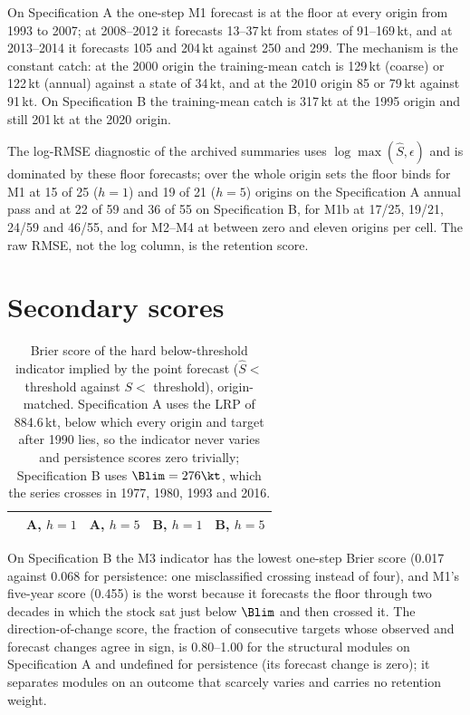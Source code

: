On Specification A the one-step M1 forecast is at the floor at every origin from 1993 to 2007; at 2008--2012 it forecasts 13--37\,kt from states of 91--169\,kt, and at 2013--2014 it forecasts 105 and 204\,kt against 250 and 299. The mechanism is the constant catch: at the 2000 origin the training-mean catch is 129\,kt (coarse) or 122\,kt (annual) against a state of 34\,kt, and at the 2010 origin 85 or 79\,kt against 91\,kt. On Specification B the training-mean catch is 317\,kt at the 1995 origin and still 201\,kt at the 2020 origin.

The log-RMSE diagnostic of the archived summaries uses $\log\max(\hat S,\epsilon)$ and is dominated by these floor forecasts; over the whole origin sets the floor binds for M1 at 15 of 25 ($h=1$) and 19 of 21 ($h=5$) origins on the Specification A annual pass and at 22 of 59 and 36 of 55 on Specification B, for M1b at 17/25, 19/21, 24/59 and 46/55, and for M2--M4 at between zero and eleven origins per cell. The raw RMSE, not the log column, is the retention score.

\FloatBarrier
\section{Secondary scores}\label{si:secondary}

\begin{table}[!htb]
\centering\small
\caption{Brier score of the hard below-threshold indicator implied by the point forecast ($\hat S < $ threshold against $S <$ threshold), origin-matched. Specification A uses the LRP of 884.6\,kt, below which every origin and target after 1990 lies, so the indicator never varies and persistence scores zero trivially; Specification B uses $\Blim = 276\kt$, which the series crosses in 1977, 1980, 1993 and 2016.}
\label{tab:si_brier}
\begin{tabular}{@{}lrrrr@{}}
\toprule
 & A, $h=1$ & A, $h=5$ & B, $h=1$ & B, $h=5$ \\
\midrule

\bottomrule
\end{tabular}
\end{table}

On Specification B the M3 indicator has the lowest one-step Brier score (0.017 against 0.068 for persistence: one misclassified crossing instead of four), and M1's five-year score (0.455) is the worst because it forecasts the floor through two decades in which the stock sat just below $\Blim$ and then crossed it. The direction-of-change score, the fraction of consecutive targets whose observed and forecast changes agree in sign, is 0.80--1.00 for the structural modules on Specification A and undefined for persistence (its forecast change is zero); it separates modules on an outcome that scarcely varies and carries no retention weight.

